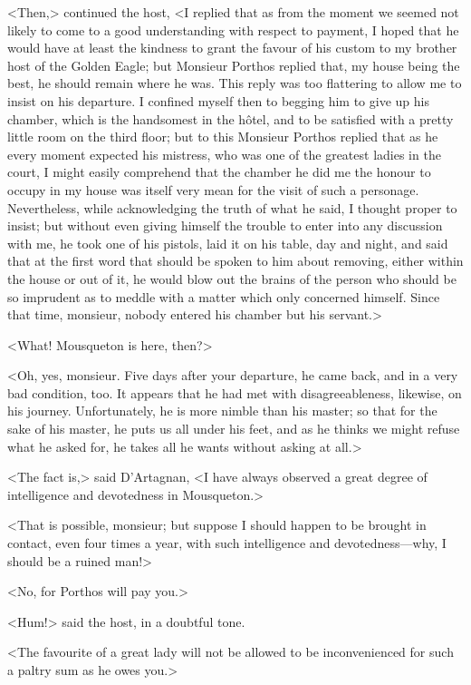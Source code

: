 <Then,> continued the host, <I replied that as from the moment we seemed not likely to come to a good understanding with respect to payment, I hoped that he would have at least the kindness to grant the favour of his custom to my brother host of the Golden Eagle; but Monsieur Porthos replied that, my house being the best, he should remain where he was. This reply was too flattering to allow me to insist on his departure. I confined myself then to begging him to give up his chamber, which is the handsomest in the hôtel, and to be satisfied with a pretty little room on the third floor; but to this Monsieur Porthos replied that as he every moment expected his mistress, who was one of the greatest ladies in the court, I might easily comprehend that the chamber he did me the honour to occupy in my house was itself very mean for the visit of such a personage. Nevertheless, while acknowledging the truth of what he said, I thought proper to insist; but without even giving himself the trouble to enter into any discussion with me, he took one of his pistols, laid it on his table, day and night, and said that at the first word that should be spoken to him about removing, either within the house or out of it, he would blow out the brains of the person who should be so imprudent as to meddle with a matter which only concerned himself. Since that time, monsieur, nobody entered his chamber but his servant.> 

<What! Mousqueton is here, then?> 

<Oh, yes, monsieur. Five days after your departure, he came back, and in a very bad condition, too. It appears that he had met with disagreeableness, likewise, on his journey. Unfortunately, he is more nimble than his master; so that for the sake of his master, he puts us all under his feet, and as he thinks we might refuse what he asked for, he takes all he wants without asking at all.> 

<The fact is,> said D'Artagnan, <I have always observed a great degree of intelligence and devotedness in Mousqueton.> 

<That is possible, monsieur; but suppose I should happen to be brought in contact, even four times a year, with such intelligence and devotedness—why, I should be a ruined man!> 

<No, for Porthos will pay you.> 

<Hum!> said the host, in a doubtful tone. 

<The favourite of a great lady will not be allowed to be inconvenienced for such a paltry sum as he owes you.> 


